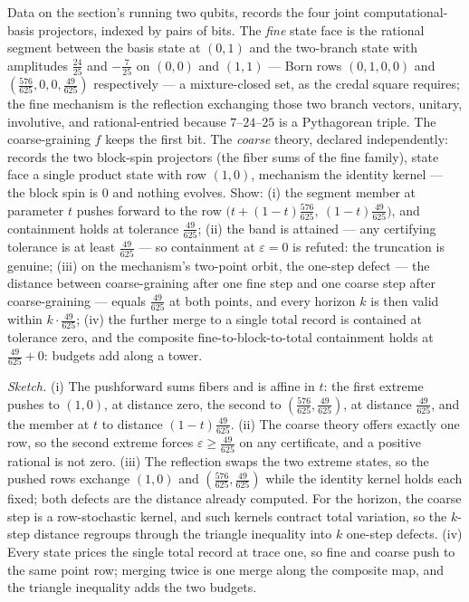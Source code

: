 \begin{problem}
\label{prob:mt-qnet-refine}
Data on the section's running two qubits, records the four joint
computational-basis projectors, indexed by pairs of bits. The
\emph{fine} state face is the rational segment between the basis
state at $(0,1)$ and the two-branch state with amplitudes
$\tfrac{24}{25}$ and $-\tfrac{7}{25}$ on $(0,0)$ and $(1,1)$ ---
Born rows $(0, 1, 0, 0)$ and $(\tfrac{576}{625}, 0, 0,
\tfrac{49}{625})$ respectively --- a mixture-closed set, as the
credal square requires; the fine mechanism is the reflection
exchanging those two branch vectors, unitary, involutive, and
rational-entried because $7$--$24$--$25$ is a Pythagorean triple.
The coarse-graining $f$ keeps the first bit. The \emph{coarse}
theory, declared independently: records the two block-spin
projectors (the fiber sums of the fine family), state face a single
product state with row $(1, 0)$, mechanism the identity kernel ---
the block spin is $0$ and nothing evolves. Show: (i) the segment
member at parameter $t$ pushes forward to the row $\big(t +
(1-t)\tfrac{576}{625},\ (1-t)\tfrac{49}{625}\big)$, and containment
holds at tolerance $\tfrac{49}{625}$; (ii) the band is attained ---
any certifying tolerance is at least $\tfrac{49}{625}$ --- so
containment at $\varepsilon = 0$ is refuted: the truncation is
genuine; (iii) on the mechanism's two-point orbit, the one-step
defect --- the distance between coarse-graining after one fine step
and one coarse step after coarse-graining --- equals
$\tfrac{49}{625}$ at both points, and every horizon $k$ is then
valid within $k \cdot \tfrac{49}{625}$; (iv) the further merge to a
single total record is contained at tolerance zero, and the
composite fine-to-block-to-total containment holds at
$\tfrac{49}{625} + 0$: budgets add along a tower.
\end{problem}

\emph{Sketch.} (i) The pushforward sums fibers and is affine in $t$:
the first extreme pushes to $(1, 0)$, at distance zero, the second
to $(\tfrac{576}{625}, \tfrac{49}{625})$, at distance
$\tfrac{49}{625}$, and the member at $t$ to distance
$(1-t)\tfrac{49}{625}$. (ii) The coarse theory offers exactly one
row, so the second extreme forces $\varepsilon \geq \tfrac{49}{625}$
on any certificate, and a positive rational is not zero. (iii) The
reflection swaps the two extreme states, so the pushed rows exchange
$(1, 0)$ and $(\tfrac{576}{625}, \tfrac{49}{625})$ while the
identity kernel holds each fixed; both defects are the distance
already computed. For the horizon, the coarse step is a
row-stochastic kernel, and such kernels contract total variation, so
the $k$-step distance regroups through the triangle inequality into
$k$ one-step defects. (iv) Every state prices the single total
record at trace one, so fine and coarse push to the same point row;
merging twice is one merge along the composite map, and the triangle
inequality adds the two budgets.

